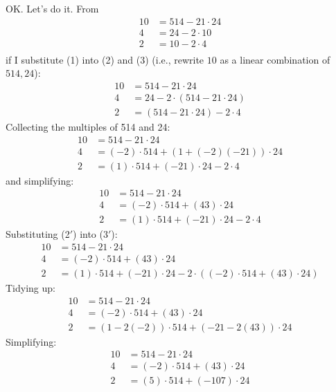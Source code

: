 OK. Let's do it.
From
\begin{align*}
10 &= 514 - 21 \cdot 24 \tag{1} \\
4  &= 24  - 2 \cdot 10  \tag{2} \\
2  &= 10  - 2 \cdot 4   \tag{3} \\
\end{align*}
if I substitute (1) into (2) and (3) (i.e., rewrite $10$ as a linear
combination of $514,24$):
\begin{align*}
10 &= 514 - 21 \cdot 24 \tag{1} \\
4  &= 24  - 2 \cdot (514 - 21 \cdot 24)  \tag{2} \\
2  &= (514 - 21 \cdot 24)  - 2 \cdot 4   \tag{3} 
\end{align*}
Collecting the multiples of 514 and 24:
\begin{align*}
10 &= 514 - 21 \cdot 24 \tag{1} \\
4  &= (-2) \cdot 514 + (1 + (-2)(-21)) \cdot 24  \tag{2'} \\
2  &= (1) \cdot 514 + (-21) \cdot 24  - 2 \cdot 4   \tag{3'} 
\end{align*}
and simplifying:
\begin{align*}
10 &= 514 - 21 \cdot 24 \tag{1} \\
4  &= (-2) \cdot 514 + (43) \cdot 24  \tag{2'} \\
2  &= (1) \cdot 514 + (-21) \cdot 24  - 2 \cdot 4   \tag{3'} 
\end{align*}
Substituting (2$'$) into (3$'$):
\begin{align*}
10 &= 514 - 21 \cdot 24 \tag{1} \\
4  &= (-2) \cdot 514 + (43) \cdot 24  \tag{2'} \\
2  &= (1) \cdot 514 + (-21) \cdot 24  - 2 \cdot ((-2) \cdot 514 + (43) \cdot 24)  \tag{3'} 
\end{align*}
Tidying up:
\begin{align*}
10 &= 514 - 21 \cdot 24 \tag{1} \\
4  &= (-2) \cdot 514 + (43) \cdot 24  \tag{2'} \\
2  &= (1 - 2(-2)) \cdot 514 + (-21 - 2(43)) \cdot 24 \tag{3''} 
\end{align*}
Simplifying:
\begin{align*}
10 &= 514 - 21 \cdot 24 \tag{1} \\
4  &= (-2) \cdot 514 + (43) \cdot 24  \tag{2'} \\
2  &= (5) \cdot 514 + (-107) \cdot 24 \tag{3''}
\end{align*}

